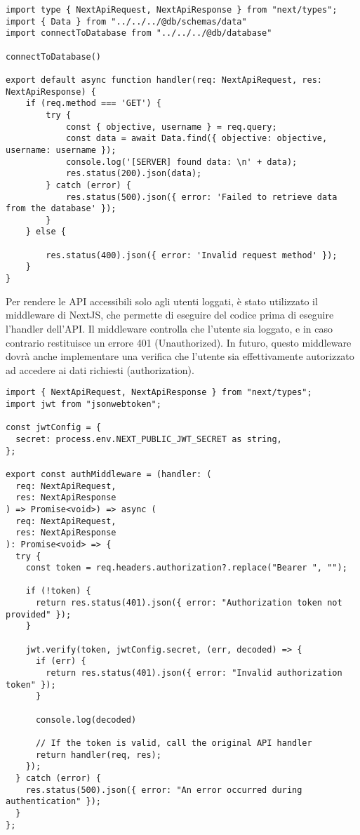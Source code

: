 \begin{verbatim}
import type { NextApiRequest, NextApiResponse } from "next/types";
import { Data } from "../../../@db/schemas/data"
import connectToDatabase from "../../../@db/database"

connectToDatabase()

export default async function handler(req: NextApiRequest, res: NextApiResponse) {
    if (req.method === 'GET') {
        try {
            const { objective, username } = req.query;
            const data = await Data.find({ objective: objective, username: username });
            console.log('[SERVER] found data: \n' + data);
            res.status(200).json(data);
        } catch (error) {
            res.status(500).json({ error: 'Failed to retrieve data from the database' });
        }
    } else {
      
        res.status(400).json({ error: 'Invalid request method' });
    }
}
\end{verbatim}


Per rendere le API accessibili solo agli utenti loggati, è stato utilizzato il middleware di NextJS, che permette di eseguire del codice prima di eseguire l'handler dell'API. Il middleware controlla che l'utente sia loggato, e in caso contrario restituisce un errore 401 (Unauthorized).
In futuro, questo middleware dovrà anche implementare una verifica che l'utente sia effettivamente autorizzato ad accedere ai dati richiesti (authorization).

\begin{verbatim}
import { NextApiRequest, NextApiResponse } from "next/types";
import jwt from "jsonwebtoken";

const jwtConfig = {
  secret: process.env.NEXT_PUBLIC_JWT_SECRET as string,
};

export const authMiddleware = (handler: (
  req: NextApiRequest,
  res: NextApiResponse
) => Promise<void>) => async (
  req: NextApiRequest,
  res: NextApiResponse
): Promise<void> => {
  try {
    const token = req.headers.authorization?.replace("Bearer ", "");

    if (!token) {
      return res.status(401).json({ error: "Authorization token not provided" });
    }

    jwt.verify(token, jwtConfig.secret, (err, decoded) => {
      if (err) {
        return res.status(401).json({ error: "Invalid authorization token" });
      }

      console.log(decoded)

      // If the token is valid, call the original API handler
      return handler(req, res);
    });
  } catch (error) {
    res.status(500).json({ error: "An error occurred during authentication" });
  }
};
\end{verbatim}


